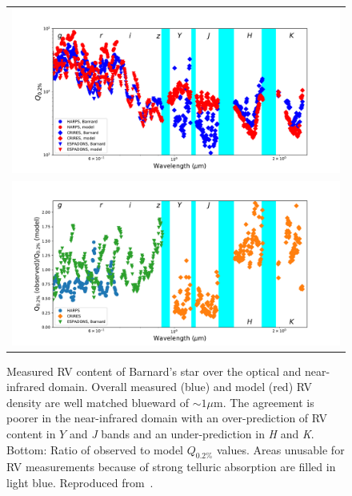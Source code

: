 \begin{figure}
    \centering
    \begin{tabular}{c}
    \includegraphics[width=0.8\linewidth]{figures/information-content/artigau2018_figures/all_w}\\
    \includegraphics[width=0.8\linewidth]{figures/information-content/artigau2018_figures/all_w2}
    \end{tabular}
    \caption[Measured RV content of Barnard's star over the optical and near-infrared domain.]{Measured RV content of Barnard's star over the optical and near-infrared domain. Overall measured (blue) and model (red) RV density are well matched blueward of $\sim1\mu$m. The agreement is poorer in the near-infrared domain with an over-prediction of RV content in $Y$ and \emph{J} bands and an under-prediction in \emph{H} and \emph{K}.
    Bottom: Ratio of observed to model $Q_{0.2\%}$ values. Areas unusable for RV measurements because of strong telluric absorption are filled in light blue. Reproduced from~\citet{artigau_optical_2018}.}
    \label{fig:allw2}
\end{figure}




